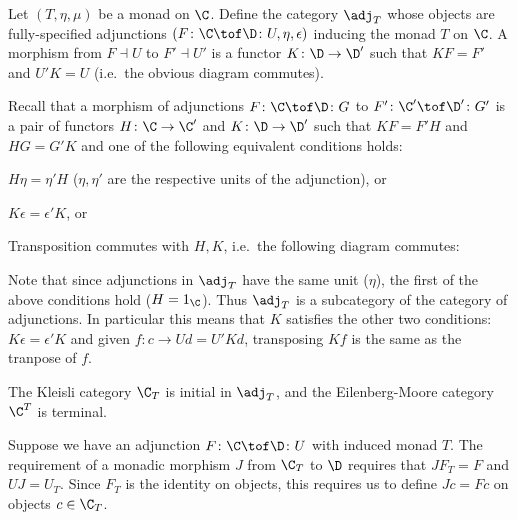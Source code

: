\eproof

\bdefn

    Let $(T,\eta,\mu)$ be a monad on $\C$.
    Define the category $\adj_T$ whose objects are fully-specified adjunctions $(F\colon\C\tof\D\colon U,\eta,\epsilon)$ inducing the monad $T$ on $\C$.
    A morphism from $F\dashv U$ to $F'\dashv U'$ is a functor $K\colon\D\to\D'$ such that $KF=F'$ and $U'K=U$ (i.e.\ the obvious diagram commutes).

\edefn

Recall that a morphism of adjunctions $F\colon\C\tof\D\colon G$ to $F'\colon\C'\tof\D'\colon G'$ is a pair of functors $H\colon\C\to\C'$ and $K\colon\D\to\D'$ such that $KF=F'H$ and $HG=G'K$ and
one of the following equivalent conditions holds:
\benum
    \item $H\eta=\eta' H$ ($\eta,\eta'$ are the respective units of the adjunction), or
    \item $K\epsilon=\epsilon' K$, or
    \item Transposition commutes with $H,K$, i.e.\ the following diagram commutes:

    \centerline{}
\eenum

Note that since adjunctions in $\adj_T$ have the same unit ($\eta$), the first of the above conditions hold ($H=1_\C$).
Thus $\adj_T$ is a subcategory of the category of adjunctions.
In particular this means that $K$ satisfies the other two conditions: $K\epsilon=\epsilon'K$ and given $f\colon c\to Ud=U'Kd$, transposing $Kf$ is the same as the tranpose of $f$.

\bprop

    The Kleisli category $\C_T$ is initial in $\adj_T$, and the Eilenberg-Moore category $\C^T$ is terminal.

\eprop

\bproof

    Suppose we have an adjunction $F\colon\C\tof\D\colon U$ with induced monad $T$.
    The requirement of a monadic morphism $J$ from $\C_T$ to $\D$ requires that $JF_T=F$ and $UJ=U_T$.
    Since $F_T$ is the identity on objects, this requires us to define $Jc=Fc$ on objects $c\in\C_T$.

